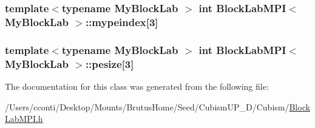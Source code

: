 \subsubsection[{mypeindex}]{\setlength{\rightskip}{0pt plus 5cm}template$<$typename My\+Block\+Lab $>$ int {\bf Block\+Lab\+M\+P\+I}$<$ My\+Block\+Lab $>$\+::mypeindex\mbox{[}3\mbox{]}\hspace{0.3cm}{\ttfamily [protected]}}\label{class_block_lab_m_p_i_a346371e08c48393a09a60188aa210828}
\hypertarget{class_block_lab_m_p_i_a3c58102452df2ae20110af79d504693e}{}
\subsubsection[{pesize}]{\setlength{\rightskip}{0pt plus 5cm}template$<$typename My\+Block\+Lab $>$ int {\bf Block\+Lab\+M\+P\+I}$<$ My\+Block\+Lab $>$\+::pesize\mbox{[}3\mbox{]}\hspace{0.3cm}{\ttfamily [protected]}}\label{class_block_lab_m_p_i_a3c58102452df2ae20110af79d504693e}


The documentation for this class was generated from the following file\+:\begin{DoxyCompactItemize}
\item 
/\+Users/cconti/\+Desktop/\+Mounts/\+Brutus\+Home/\+Seed/\+Cubism\+U\+P\+\_\+D/\+Cubism/\hyperlink{_block_lab_m_p_i_8h}{Block\+Lab\+M\+P\+I.\+h}\end{DoxyCompactItemize}
